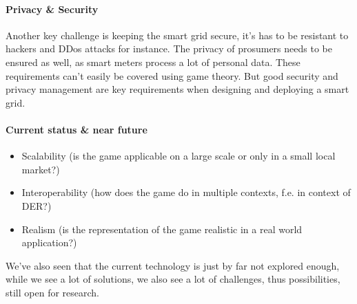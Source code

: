 \paragraph{Privacy \& Security}
Another key challenge is keeping the smart grid secure, it's has to be resistant to hackers and DDos attacks for instance. The privacy of prosumers needs to be ensured as well, as smart meters process a lot of personal data. These requirements can't easily be covered using game theory. But good security and privacy management are key requirements when designing and deploying a smart grid. 

\paragraph{Current status \& near future}


\begin{itemize}
	\item Scalability (is the game applicable on a large scale or only in a small local market?)
	\item Interoperability (how does the game do in multiple contexts, f.e. in context of DER?)
	\item Realism (is the representation of the game realistic in a real world application?)
\end{itemize}




We've also seen that the current technology is just by far not explored enough, while we see a lot of solutions, we also see a lot of challenges, thus possibilities, still open for research. 

